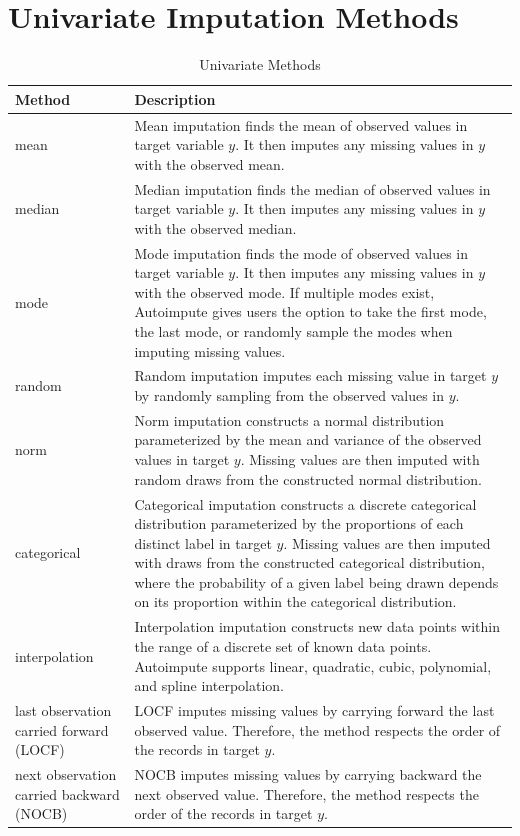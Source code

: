 \documentclass[12pt,oneside]{chicagocapstone}
\begin{document}
\chapter{Univariate Imputation
Methods}\label{univariate-imputation-methods}
\begin{longtabu} to 
\caption{\label{tab:appendixeunivar}Univariate Methods}\\
\toprule
\begingroup\fontsize{13}{15}\selectfont \textbf{Method}\endgroup & \begingroup\fontsize{13}{15}\selectfont \textbf{Description}\endgroup\\
\midrule
mean & Mean imputation finds the mean of observed values in target variable $y$. It then imputes any missing values in $y$ with the observed mean.\\
median & Median imputation finds the median of observed values in target variable $y$. It then imputes any missing values in $y$ with the observed median.\\
mode & Mode imputation finds the mode of observed values in target variable $y$. It then imputes any missing values in $y$ with the observed mode. If multiple modes exist, Autoimpute gives users the option to take the first mode, the last mode, or randomly sample the modes when imputing missing values.\\
random & Random imputation imputes each missing value in target $y$ by randomly sampling from the observed values in $y$.\\
norm & Norm imputation constructs a normal distribution parameterized by the mean and variance of the observed values in target $y$. Missing values are then imputed with random draws from the constructed normal distribution.\\
\addlinespace
categorical & Categorical imputation constructs a discrete categorical distribution parameterized by the proportions of each distinct label in target $y$. Missing values are then imputed with draws from the constructed categorical distribution, where the probability of a given label being drawn depends on its proportion within the categorical distribution.\\
interpolation & Interpolation imputation constructs new data points within the range of a discrete set of known data points. Autoimpute supports linear, quadratic, cubic, polynomial, and spline interpolation.\\
last observation carried forward (LOCF) & LOCF imputes missing values by carrying forward the last observed value. Therefore, the method respects the order of the records in target $y$.\\
next observation carried backward (NOCB) & NOCB imputes missing values by carrying backward the next observed value. Therefore, the method respects the order of the records in target $y$.\\
\bottomrule
\end{longtabu}
\end{document}
